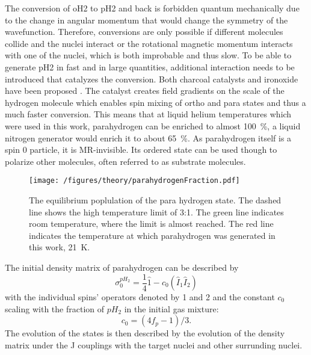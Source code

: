             The conversion of oH2 to pH2 and back is forbidden quantum mechanically due to the change in angular momentum that would change the symmetry of the wavefunction. Therefore, conversions are only possible if different molecules collide and the nuclei interact or the rotational magnetic momentum interacts with one of the nuclei, which is both improbable and thus slow. To be able to generate pH2 in fast and in large quantities, additional interaction needs to be introduced that catalyzes the conversion. Both charcoal catalysts and ironoxide have been proposed \cite{}. The catalyst creates field gradients on the scale of the hydrogen molecule which enables spin mixing of ortho and para states\cite{spinCatalysisOfOrthoParaHydrogenConversion} and thus a much faster conversion. This means that at liquid helium temperatures which were used in this work, parahydrogen can be enriched to almost \SI{100}{\%}, a liquid nitrogen generator would enrich it to about \SI{65}{\%}.
            As parahydrogen itself is a spin 0 particle, it is MR-invisible. Its ordered state can be used though to polarize other molecules, often referred to as substrate molecules.
            \begin{figure}
                \centering
                \texttt{[image: /figures/theory/parahydrogenFraction.pdf]}
                \caption[Parahydrogen fraction]{The equilibrium poplulation of the para hydrogen state. The dashed line shows the high temperature limit of 3:1. The green line indicates room temperature, where the limit is almost reached. The red line indicates the temperature at which parahydrogen was generated in this work, \SI{21}{\kelvin}.}
                \label{figure:theory:ph2Fraction}
            \end{figure}
            The initial density matrix of parahydrogen can be described by
            \begin{equation}
                \sigma_0^{pH_2} = \frac{1}{4} \hat 1 - c_0(\hat{I}_1\hat{I}_2)
            \end{equation}
            with the individual spins' operators denoted by 1 and 2 and the constant $c_0$ scaling with the fraction of $pH_2$ in the initial gas mixture:
            \begin{equation*}
                c_0=(4f_p-1)/3.
            \end{equation*}
            The evolution of the states is then described by the evolution of the density matrix under the J couplings with the target nuclei and other surrunding nuclei. 
